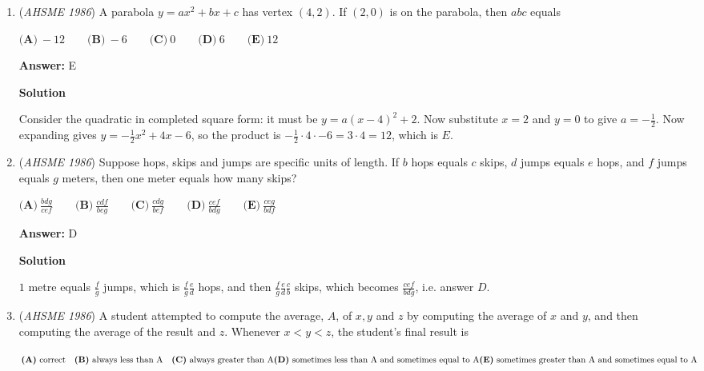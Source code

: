 \begin{enumerate}
 


	\item (\textit{AHSME 1986}) A parabola $y = ax^{2} + bx + c$ has vertex $(4,2)$. If $(2,0)$ is on the parabola, then $abc$ equals


 $\textbf{(A)}\ -12\qquad \textbf{(B)}\ -6\qquad \textbf{(C)}\ 0\qquad \textbf{(D)}\ 6\qquad \textbf{(E)}\ 12$

 \textbf{Answer: }E



\textbf{Solution}

Consider the quadratic in completed square form: it must be $y=a(x-4)^{2}+2$. Now substitute $x=2$ and $y=0$ to give $a=-\frac{1}{2}$. Now expanding gives $y=-\frac{1}{2}x^{2}+4x-6$, so the product is $-\frac{1}{2} \cdot 4 \cdot -6  = 3 \cdot 4 = 12$, which is $\boxed{E}$.

 


	\item (\textit{AHSME 1986}) Suppose hops, skips and jumps are specific units of length. If $b$ hops equals $c$ skips, $d$ jumps equals $e$ hops, 
and $f$ jumps equals $g$ meters, then one meter equals how many skips?


 $\textbf{(A)}\ \frac{bdg}{cef}\qquad \textbf{(B)}\ \frac{cdf}{beg}\qquad \textbf{(C)}\ \frac{cdg}{bef}\qquad \textbf{(D)}\ \frac{cef}{bdg}\qquad \textbf{(E)}\ \frac{ceg}{bdf}$

 \textbf{Answer: }D



\textbf{Solution}

$1$ metre equals $\frac{f}{g}$ jumps, which is $\frac{f}{g} \frac{e}{d}$ hops, and then $\frac{f}{g} \frac{e}{d} \frac{c}{b}$ skips, which becomes $\frac{cef}{bdg}$, i.e. answer $\boxed{D}$.

 


	\item (\textit{AHSME 1986}) A student attempted to compute the average, $A$, of $x, y$ and $z$ by computing the average of $x$ and $y$, and then computing the average of the result and $z$. Whenever $x < y < z$, the student's final result is


 $\textbf{(A)}\ \text{correct}\quad \textbf{(B)}\ \text{always less than A}\quad \textbf{(C)}\ \text{always greater than A}\quad\\ \textbf{(D)}\ \text{sometimes less than A and sometimes equal to A}\quad\\ \textbf{(E)}\ \text{sometimes greater than A and sometimes equal to A}  \quad$


\end{enumerate}
